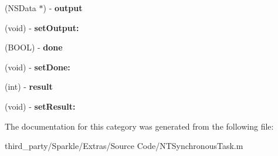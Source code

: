 \begin{DoxyCompactItemize}
\item 
\mbox{\label{category_n_t_synchronous_task_07_private_08_ae732a538da8622f4baeb10aa8b56e45f}} 
(N\+S\+Data $\ast$) -\/ {\bfseries output}
\item 
\mbox{\label{category_n_t_synchronous_task_07_private_08_aa1d628d216e63dd9b1b50decea5950c1}} 
(void) -\/ {\bfseries set\+Output\+:}
\item 
\mbox{\label{category_n_t_synchronous_task_07_private_08_af9d3453edf860af5a5a2ea38ce2651da}} 
(B\+O\+OL) -\/ {\bfseries done}
\item 
\mbox{\label{category_n_t_synchronous_task_07_private_08_a93ac3acf98dfc37ac5d84c29216b7e6c}} 
(void) -\/ {\bfseries set\+Done\+:}
\item 
\mbox{\label{category_n_t_synchronous_task_07_private_08_a74e549c15cf07e2145d28167300948e7}} 
(int) -\/ {\bfseries result}
\item 
\mbox{\label{category_n_t_synchronous_task_07_private_08_a1268de090086e6a4ae8136e3708b7d71}} 
(void) -\/ {\bfseries set\+Result\+:}
\end{DoxyCompactItemize}


The documentation for this category was generated from the following file\+:\begin{DoxyCompactItemize}
\item 
third\+\_\+party/\+Sparkle/\+Extras/\+Source Code/N\+T\+Synchronous\+Task.\+m\end{DoxyCompactItemize}
